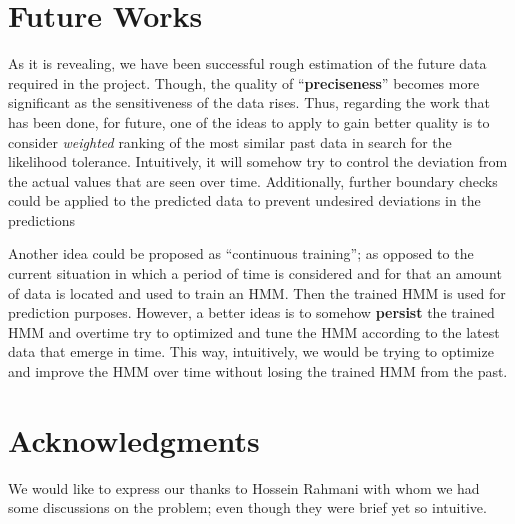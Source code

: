 \documentclass{acm_proc_article-sp}
\begin{document}
\section{Future Works} \label{sec:future}
As it is revealing, we have been successful rough estimation of the future data required in the project. Though, the
quality of ``\textbf{preciseness}'' becomes more significant as the sensitiveness of the data rises. Thus, regarding
the work that has been done, for future, one of the ideas to apply to gain better quality is to consider
\textit{weighted} ranking of the most similar past data in search for the likelihood tolerance. Intuitively, it will
somehow try to control the deviation from the actual values that are seen over time. Additionally, further boundary
checks could be applied to the predicted data to prevent undesired deviations in the predictions

Another idea could be proposed as ``continuous training''; as opposed to the current situation in which a period of
time is considered and for that an amount of data is located and used to train an HMM. Then the trained HMM is used for
prediction purposes. However, a better ideas is to somehow \textbf{persist} the trained HMM and overtime try to
optimized and tune the HMM according to the latest data that emerge in time. This way, intuitively, we would be trying
to optimize and improve the HMM over time without losing the trained HMM from the past.

\section{Acknowledgments} \label{sec:ack}
We would like to express our thanks to Hossein Rahmani with whom we had some discussions on the problem; even though
they were brief yet so intuitive.



\end{document}
